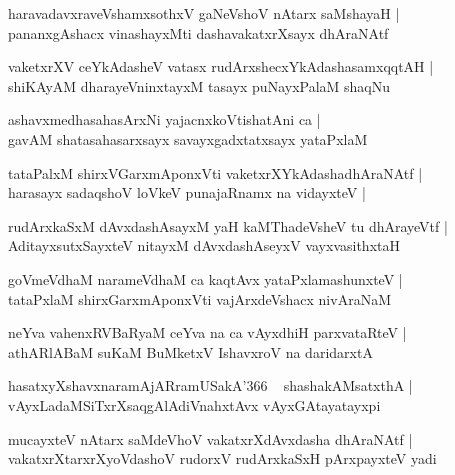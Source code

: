 \documentclass[twoside,12pt,openright]{book}
\newcounter{shloka}[chapter]
\begin{document}
\begin{shloka}%
haravadavxraveVshamxsothxV gaNeVshoV nAtarx saMshayaH |\\
pananxgAshacx vinashayxMti dashavakatxrXsayx dhAraNAtf 
\end{shloka}

\begin{shloka}%
vaketxrXV ceYkAdasheV vatasx rudArxshecxYkAdashasamxqqtAH |\\
shiKAyAM dharayeVninxtayxM tasayx puNayxPalaM shaqNu
\end{shloka}

\begin{shloka}%
ashavxmedhasahasArxNi yajacnxkoVtishatAni ca |\\
gavAM shatasahasarxsayx savayxgadxtatxsayx yataPxlaM 
\end{shloka}

\begin{shloka}%
tataPalxM shirxVGarxmAponxVti vaketxrXYkAdashadhAraNAtf |\\
harasayx sadaqshoV loVkeV punajaRnamx na vidayxteV |
\end{shloka}

\begin{shloka}%
rudArxkaSxM dAvxdashAsayxM yaH kaMThadeVsheV tu dhArayeVtf |\\
AditayxsutxSayxteV nitayxM dAvxdashAseyxV vayxvasithxtaH 
\end{shloka}

\begin{shloka}%
goVmeVdhaM narameVdhaM ca kaqtAvx yataPxlamashunxteV |\\
tataPxlaM shirxGarxmAponxVti vajArxdeVshacx nivAraNaM 
\end{shloka}

\begin{shloka}%
neYva vahenxRVBaRyaM ceYva na ca vAyxdhiH parxvataRteV |\\
athARlABaM suKaM BuMketxV IshavxroV na daridarxtA 
\end{shloka}

\begin{shloka}%
hasatxyXshavxnaramAjARramUSakA\char'366 ~ shashakAMsatxthA |\\
vAyxLadaMSiTxrXsaqgAlAdiVnahxtAvx vAyxGAtayatayxpi
\end{shloka}

\begin{shloka}%
mucayxteV nAtarx saMdeVhoV vakatxrXdAvxdasha dhAraNAtf |\\
vakatxrXtarxrXyoVdashoV rudorxV rudArxkaSxH pArxpayxteV yadi 
\end{shloka}
\end{document}
